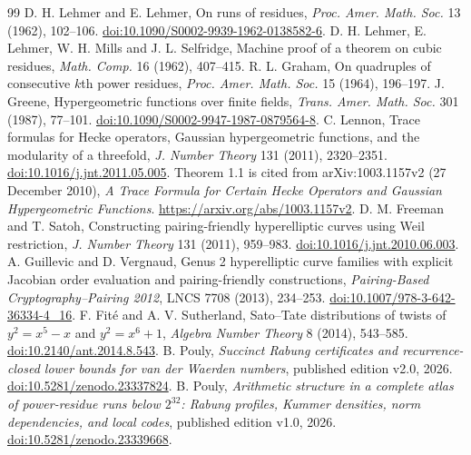 \documentclass[11pt]{article}
\theoremstyle{definition}\newtheorem{definition}[theorem]{Definition}
\begin{document}
\begin{thebibliography}{99}
D. H. Lehmer and E. Lehmer, On runs of residues,
\emph{Proc. Amer. Math. Soc.} 13 (1962), 102--106.
\href{https://doi.org/10.1090/S0002-9939-1962-0138582-6}{doi:10.1090/S0002-9939-1962-0138582-6}.
D. H. Lehmer, E. Lehmer, W. H. Mills and J. L. Selfridge,
Machine proof of a theorem on cubic residues,
\emph{Math. Comp.} 16 (1962), 407--415.
R. L. Graham, On quadruples of consecutive $k$th power residues,
\emph{Proc. Amer. Math. Soc.} 15 (1964), 196--197.
J. Greene, Hypergeometric functions over finite fields,
\emph{Trans. Amer. Math. Soc.} 301 (1987), 77--101.
\href{https://doi.org/10.1090/S0002-9947-1987-0879564-8}{doi:10.1090/S0002-9947-1987-0879564-8}.
C. Lennon, Trace formulas for Hecke operators, Gaussian
hypergeometric functions, and the modularity of a threefold,
\emph{J. Number Theory} 131 (2011), 2320--2351.
\href{https://doi.org/10.1016/j.jnt.2011.05.005}{doi:10.1016/j.jnt.2011.05.005}.
Theorem 1.1 is cited from arXiv:1003.1157v2 (27 December 2010),
\emph{A Trace Formula for Certain Hecke Operators and Gaussian
Hypergeometric Functions}.
\url{https://arxiv.org/abs/1003.1157v2}.
D. M. Freeman and T. Satoh, Constructing pairing-friendly
hyperelliptic curves using Weil restriction,
\emph{J. Number Theory} 131 (2011), 959--983.
\href{https://doi.org/10.1016/j.jnt.2010.06.003}{doi:10.1016/j.jnt.2010.06.003}.
A. Guillevic and D. Vergnaud, Genus 2 hyperelliptic curve families
with explicit Jacobian order evaluation and pairing-friendly
constructions, \emph{Pairing-Based Cryptography--Pairing 2012},
LNCS 7708 (2013), 234--253.
\href{https://doi.org/10.1007/978-3-642-36334-4_16}{doi:10.1007/978-3-642-36334-4\_16}.
F. Fit\'e and A. V. Sutherland, Sato--Tate distributions of twists
of $y^2=x^5-x$ and $y^2=x^6+1$,
\emph{Algebra Number Theory} 8 (2014), 543--585.
\href{https://doi.org/10.2140/ant.2014.8.543}{doi:10.2140/ant.2014.8.543}.
B. Pouly, \emph{Succinct Rabung certificates and recurrence-closed lower
bounds for van der Waerden numbers}, published edition v2.0, 2026.
\href{https://doi.org/10.5281/zenodo.23337824}{doi:10.5281/zenodo.23337824}.
B. Pouly, \emph{Arithmetic structure in a complete atlas of power-residue
runs below $2^{32}$: Rabung profiles, Kummer densities, norm dependencies,
and local codes}, published edition v1.0, 2026.
\href{https://doi.org/10.5281/zenodo.23339668}{doi:10.5281/zenodo.23339668}.

\end{thebibliography}
\end{document}

